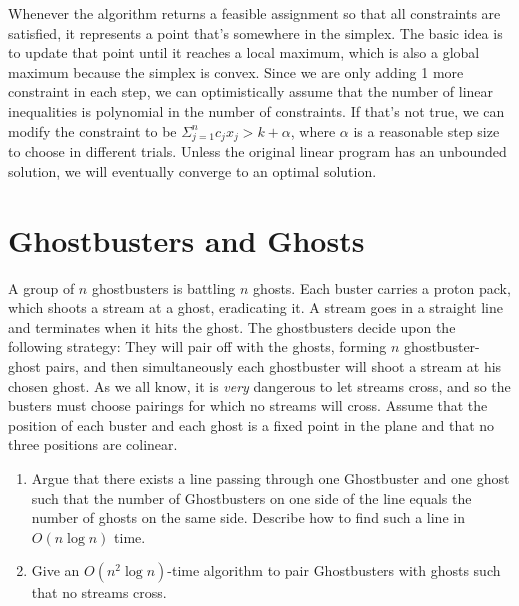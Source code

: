 \documentclass[11pt]{article}
\begin{document}
\begin{enumerate}[leftmargin=*, topsep=0pt]
      Whenever the algorithm returns a feasible assignment so that all constraints are satisfied, it represents a point that's somewhere in the simplex. The basic idea is to update that point until it reaches a local maximum, which is also a global maximum because the simplex is convex. Since we are only adding 1 more constraint in each step, we can optimistically assume that the number of linear inequalities is polynomial in the number of constraints. If that's not true, we can modify the constraint to be $\Sigma_{j=1}^{n} c_jx_j > k + \alpha$, where $\alpha$ is a reasonable step size to choose in different trials. Unless the original linear program has an unbounded solution, we will eventually converge to an optimal solution.
    \end{enumerate}

  \section{Ghostbusters and Ghosts}
    A group of $n$ ghostbusters is battling $n$ ghosts. Each buster carries a proton pack, which shoots a stream at a ghost, eradicating it. A stream goes in a straight line and terminates when it hits the ghost. The ghostbusters decide upon the following strategy: They will pair off with the ghosts, forming $n$ ghostbuster-ghost pairs, and then simultaneously each ghostbuster will shoot a stream at his chosen ghost. As we all know, it is \textit{very} dangerous to let streams cross, and so the busters must choose pairings for which no streams will cross. Assume that the position of each buster and each ghost is a fixed point in the plane and that no three positions are colinear.
    \begin{enumerate}[leftmargin=*]
      \item Argue that there exists a line passing through one Ghostbuster and one ghost such that the number of Ghostbusters on one side of the line equals the number of ghosts on the same side. Describe how to find such a line in $O(n \log n)$ time.
      \item Give an $O(n^2 \log n)$-time algorithm to pair Ghostbusters with ghosts such that no streams cross.
    \end{enumerate}
\end{document}
